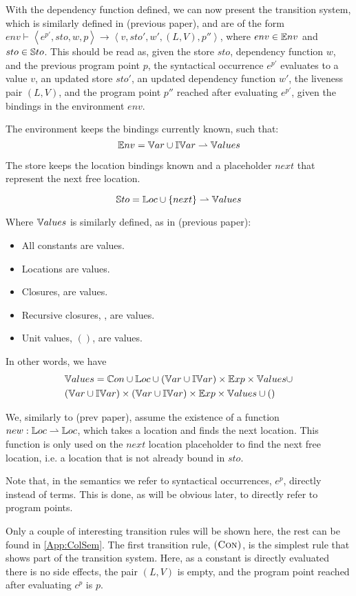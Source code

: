 \documentclass[../../master.tex]{subfiles}
\begin{document}
With the dependency function defined, we can now present the transition system, which is similarly defined in (previous paper), and are of the form $env\vdash\left\langle e^{p'},sto,w,p\right\rangle\rightarrow\left\langle v,sto',w',(L,V),p''\right\rangle$, where $env\in\mathbb{E}nv$ and $sto\in\mathbb{S}to$.
This should be read as, given the store $sto$, dependency function $w$, and the previous program point $p$, the syntactical occurrence $e^{p'}$ evaluates to a value $v$, an updated store $sto'$, an updated dependency function $w'$, the liveness pair $(L,V)$, and the program point $p''$ reached after evaluating $e^{p'}$, given the bindings in the environment $env$.

The environment keeps the bindings currently known, such that:
$$\mathbb{E}nv=\mathbb{V}ar\cup\mathbb{IV}ar\rightharpoonup\mathbb{V}alues$$

The store keeps the location bindings known and a placeholder $next$ that represent the next free location.

$$\mathbb{S}to=\mathbb{L}oc\cup\{next\}\rightharpoonup\mathbb{V}alues$$

Where $\mathbb{V}alues$ is similarly defined, as in (previous paper):
\begin{itemize}
	\item All constants are values.
	\item Locations are values.
	\item Closures,  are values.
	\item Recursive closures, , are values.
	\item Unit values, $()$, are values.
\end{itemize}
In other words, we have
\begin{align*}
	&\mathbb{V}alues=\mathbb{C}on\cup\mathbb{L}oc\cup(\mathbb{V}ar\cup\mathbb{IV}ar)\times\mathbb{E}xp\times\mathbb{V}alues\cup\\
	&(\mathbb{V}ar\cup\mathbb{IV}ar)\times(\mathbb{V}ar\cup\mathbb{IV}ar)\times\mathbb{E}xp\times\mathbb{V}alues\cup()
\end{align*}

We, similarly to (prev paper), assume the existence of a function $new:\mathbb{L}oc\rightharpoonup\mathbb{L}oc$, which takes a location and finds the next location.
This function is only used on the $next$ location placeholder to find the next free location, i.e. a location that is not already bound in $sto$.

Note that, in the semantics we refer to syntactical occurrences, $e^p$, directly instead of terms.
This is done, as will be obvious later, to directly refer to program points.
\bigskip

Only a couple of interesting transition rules will be shown here, the rest can be found in \cref{App:ColSem}.
The first transition rule, $\textsc{(Con)}$, is the simplest rule that shows part of the transition system.
Here, as a constant is directly evaluated there is no side effects, the pair $(L,V)$ is empty, and the program point reached after evaluating $c^p$ is $p$.
\end{document}
